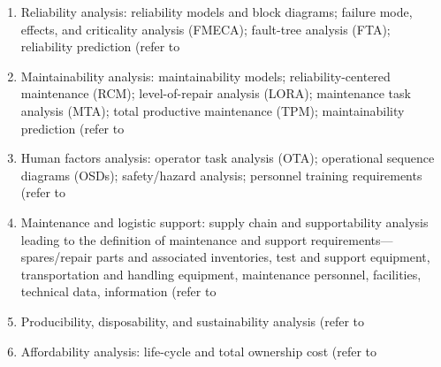\begin{enumerate}
	\item Reliability analysis: reliability models and block diagrams; failure mode, effects, and criticality analysis (FMECA); fault-tree analysis (FTA); reliability prediction (refer to 
	\item Maintainability analysis: maintainability models; reliability-centered maintenance (RCM); level-of-repair analysis (LORA); maintenance task analysis (MTA); total productive maintenance (TPM); maintainability prediction (refer to 
	\item Human factors analysis: operator task analysis (OTA); operational sequence diagrams (OSDs); safety/hazard analysis; personnel training requirements (refer to 
	\item Maintenance and logistic support: supply chain and supportability analysis leading to the definition of maintenance and support requirements—spares/repair parts and associated inventories, test and support equipment, transportation and handling equipment, maintenance personnel, facilities, technical data, information (refer to 
	\item Producibility, disposability, and sustainability analysis (refer to 
	\item Affordability analysis: life-cycle and total ownership cost (refer to 
\end{enumerate}

